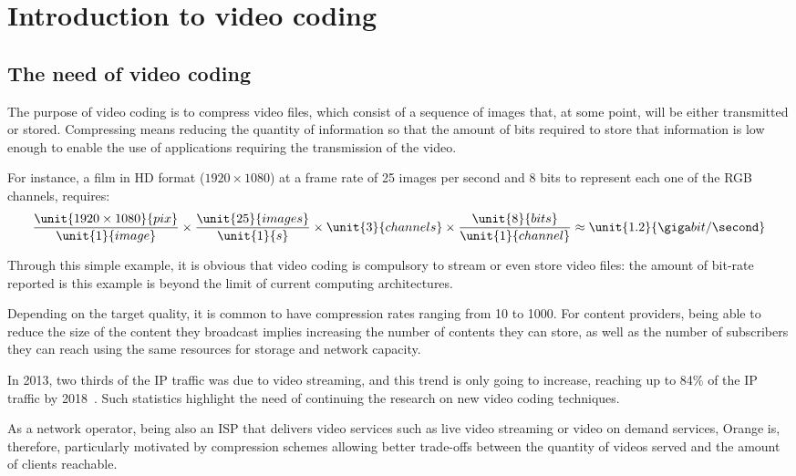 \documentclass[11pt,a4paper,openright,twoside]{book}
\numberwithin{equation}{section} %
\numberwithin{figure}{section} %
\numberwithin{table}{section} %
\begin{document}
\section{Introduction to video coding}
\label{sec:introduction_to_video_coding}

\subsection{The need of video coding}
\label{sub:the_need_of_video_coding}

The purpose of video coding is to compress video files, which consist of
a sequence of images that, at some point, will be either transmitted or
stored.
Compressing means reducing the quantity of information so that the amount of
bits required to store that information is low enough to enable the use of
applications requiring the transmission of the video.

For instance, a film in \ac{HD} format ($1920 \times 1080$)
at a frame rate of 25 images per second and 8 bits to represent each one
of the \ac{RGB} channels, requires:
\[
	\frac{\unit{1920\times1080}{pix}}{\unit{1}{image}}
	\times \frac{\unit{25}{images}}{\unit{1}{s}}
	\times \unit{3}{channels} \times \frac{\unit{8}{bits}}{\unit{1}{channel}}
	\approx \unit{1.2}{\giga bit/\second}
\]

Through this simple example, it is obvious that video coding is compulsory
to stream or even store video files:
the amount of bit-rate reported is this example is beyond the limit of current
computing architectures.

Depending on the target quality, it is common to have compression rates
ranging from 10 to 1000.
For content providers, being able to reduce the size of the content they
broadcast implies increasing the number of contents they can store, as
well as the number of subscribers they can reach using the same
resources for storage and network capacity.

In 2013, two thirds of the \ac{IP} traffic was due to video
streaming, and this trend is only going to increase, reaching up to 84\%
of the \acs{IP} traffic by 2018~\cite{cisco-13-vni-forecast}.
Such statistics highlight the need of continuing the research on
new video coding techniques.

As a network operator, being also an \ac{ISP} that delivers video services
such as live video streaming or video on demand services, Orange is,
therefore, particularly motivated by compression schemes allowing better
trade-offs between the quantity of videos served and the amount of clients
reachable.
\end{document}
